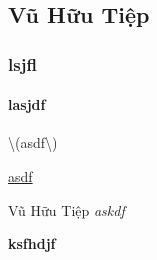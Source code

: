\subsection{Vũ Hữu Tiệp}\label{vux169-hux1eefu-tiux1ec7p}

\subsubsection{lsjfl}\label{lsjfl}

\paragraph{lasjdf}\label{lasjdf}

\textbackslash{}(asdf\textbackslash{})

\href{google.com}{asdf}

Vũ Hữu Tiệp \emph{askdf}

\textbf{ksfhdjf}
